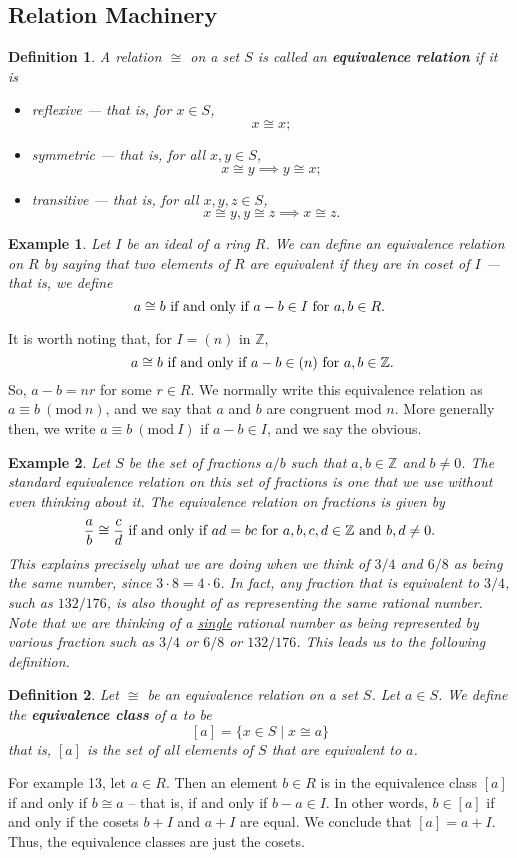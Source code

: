 \documentclass[12pt,reqno]{amsart}
\theoremstyle{plain}
\newtheorem{defi}{Definition}
\newtheorem{ex}{Example}
\newcommand{\zz}{\mathbb Z}
\newcommand{\Mod}[1]{\ (\mathrm{mod}\ #1)}
\begin{document}
\subsection*{Relation Machinery}
\begin{defi} A relation $\cong$ on a set $S$ is called an \textbf{equivalence relation} if it is
\begin{itemize}
\item[\textup{1}.] reflexive — that is, for $x \in S$,
\[
x \cong x;
\]
\item[$2$.] symmetric — that is, for all $x, y \in S$, 
\[
x \cong y \implies y \cong x;
\]
\item[$3$.] transitive — that is, for all $x, y, z\in S$, 
\[
x \cong y, y \cong z \implies x \cong z.
\]
\end{itemize}
\end{defi} 
\begin{ex} Let $I$ be an ideal of a ring $R$. We can define an equivalence relation on $R$ by saying that two elements of $R$ are equivalent if they are in coset of $I$ — that is, we define
\[
\textup{$a \cong b$ if and only if $a-b \in I$ for $a, b \in R$.}
\]
\end{ex} 
It is worth noting that, for $I = (n)$ in $\zz$,  
\[
\textup{ $a \cong b$ if and only if $a-b \in (n)$ for $a, b \in \zz$.}
\]
So, $a-b=nr$ for some $r \in R$. We normally write this equivalence relation as $a \equiv b \Mod{n}$, and we say that $a$ and $b$ are congruent mod $n$. More generally then, we write $a \equiv b \Mod{I}$ if $a-b \in I$, and we say the obvious. 

\begin{ex}
Let $S$ be the set of fractions $a/b$ such that $a, b \in \zz$ and $b \neq 0$. The standard equivalence relation on this set of fractions is one that we use without even thinking about it. The equivalence relation on fractions is given by
\[
\textup{$\frac{a}{b} \cong \frac{c}{d}$ if and only if $ad = bc$ for $a, b, c, d \in \zz$ and $b,d \neq 0$.}
\]
This explains precisely what we are doing when we think of $3/4$ and $6/8$ as being the same number, since $3 \cdot 8 = 4 \cdot 6$. In fact, any fraction that is equivalent to $3/4$, such as $132/176$, is also thought of as representing the same rational number. Note that we are thinking of a \underline{single} rational number as being represented by various fraction such as $3/4$ or $6/8$ or $132/176$. This leads us to the following definition. 
\end{ex} 
\begin{defi} Let $\cong$ be an equivalence relation on a set $S$. Let $a \in S$. We define the \textbf{equivalence class} of $a$ to be 
\[
[a] = \{ x \in S \mid x \cong a \}
\]
that is, $[a]$ is the set of all elements of $S$ that are equivalent to $a$. 
\end{defi} 
For example 13, let $a \in R$. Then an element $b \in R$ is in the equivalence class $[a]$ if and only if $b \cong a$ – that is, if and only if $b-a \in I$. In other words, $b \in [a]$ if and only if the cosets $b+I$ and $a+I$ are equal. We conclude that $[a] = a+I$. Thus, the equivalence classes are just the cosets. 
\end{document}
